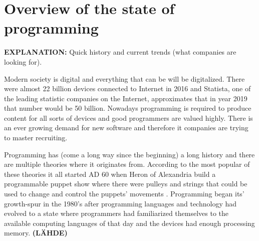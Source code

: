 \documentclass[11pt,a4paper,oneside,article]{memoir}
\begin{document}
\cite{baggelaar:thesis}

\section{Overview of the state of programming}

\textbf{EXPLANATION:} Quick history and current trends (what companies are looking for). %

Modern society is digital and everything that can be will be digitalized. There were almost 22 billion devices connected to Internet in 2016 and Statista, one of the leading statistic companies on the Internet, approximates that in year 2019 that number would be 50 billion. \cite{statista:numberof} Nowadays programming is required to produce content for all sorts of devices and good programmers are valued highly. There is an ever growing demand for new software and therefore \gls{it} companies are trying to master recruiting.

Programming has (come a long way since the beginning) %
a long history and there are multiple theories where it originates from. According to the most popular of these theories it all started AD 60 when Heron of Alexandria build a programmable puppet show where there were pulleys and strings that could be used to change and control the puppets' movements \cite{Randell:1994}. Programming began its' growth-spur in the 1980's after programming languages and technology had evolved to a state where programmers had familiarized themselves to the available computing languages of that day and the devices had enough processing memory. \textbf{(LÄHDE)}
\end{document}
